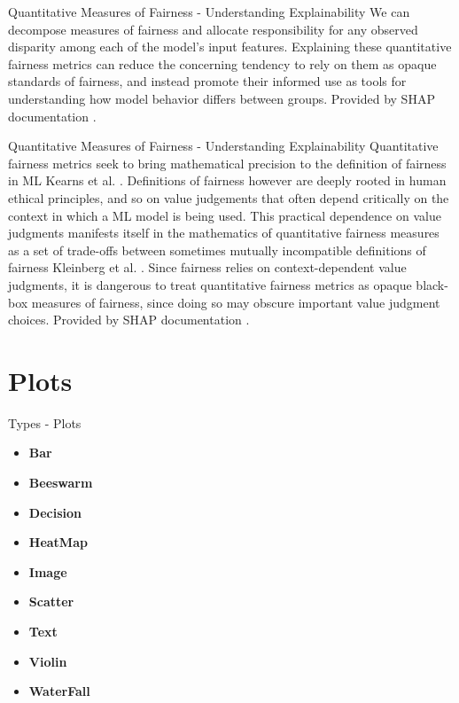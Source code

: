 \documentclass[aspectratio=169]{beamer}
\begin{document}
\begin{frame}{Quantitative Measures of Fairness - Understanding Explainability}
     We can decompose measures of fairness and allocate responsibility for any observed disparity among each of the model’s input features. Explaining these quantitative fairness metrics can reduce the concerning tendency to rely on them as opaque standards of fairness, and instead promote their informed use as tools for understanding how model behavior differs between groups. Provided by \ac{SHAP} documentation \cite{shap_docs_fairness}.
\end{frame}

\begin{frame}{Quantitative Measures of Fairness - Understanding Explainability}
     Quantitative fairness metrics seek to bring mathematical precision to the definition of fairness in \ac{ML} Kearns et al. \cite{10.5555/3379082}. Definitions of fairness however are deeply rooted in human ethical principles, and so on value judgements that often depend critically on the context in which a \ac{ML} model is being used. This practical dependence on value judgments manifests itself in the mathematics of quantitative fairness measures as a set of trade-offs between sometimes mutually incompatible definitions of fairness Kleinberg et al. \cite{DBLP:journals/corr/KleinbergMR16}. Since fairness relies on context-dependent value judgments, it is dangerous to treat quantitative fairness metrics as opaque black-box measures of fairness, since doing so may obscure important value judgment choices. Provided by \ac{SHAP} documentation \cite{shap_docs_fairness}.
\end{frame}

\section{Plots}

\begin{frame}{Types - Plots}
    \begin{itemize}
        \item \textbf{Bar}
        \item \textbf{Beeswarm}
        \item \textbf{Decision}
        \item \textbf{HeatMap}
        \item \textbf{Image}
        \item \textbf{Scatter}
        \item \textbf{Text}
        \item \textbf{Violin}
        \item \textbf{WaterFall}
    \end{itemize}   
\end{frame}
\end{document}
